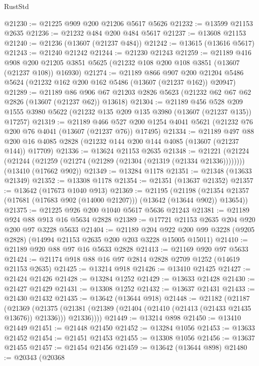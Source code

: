 \begin{lexlean}{RustStd}
\begin{coremodule}
@21230 := @21225 @909 @200 @21206 @5617 @5626
@21232 := @13599 @21153 @2635
@21236 := @21232 @484 @200 @484 @5617
@21237 := @13608 @21153
@21240 := @21236 (@13607 (@21237 @484))
@21242 := @13615 (@13616 @5617)
@21243 := @21240 @21242
@21244 := @21230 @21243
@21259 := @21189
    @416
    @908
    @200
    @21205
    @3851
    @5625
    (@21232 @108 @200 @108 @3851 (@13607 (@21237 @108)) @16930)
@21274 := @21189
    @866
    @907
    @200
    @21204
    @5486
    @5624
    (@21232 @162 @200 @162 @5486 (@13607 (@21237 @162)) @20947)
@21289 := @21189
    @86
    @906
    @67
    @21203
    @2826
    @5623
    (@21232 @62 @67 @62 @2826 (@13607 (@21237 @62)) @13618)
@21304 := @21189
    @456
    @528
    @209
    @1555
    @3980
    @5622
    (@21232 @135 @209 @135 @3980 (@13607 (@21237 @135)) @17257)
@21319 := @21189
    @466
    @527
    @200
    @1254
    @4041
    @5621
    (@21232 @76 @200 @76 @4041 (@13607 (@21237 @76)) @17495)
@21334 := @21189
    @497
    @88
    @200
    @16
    @4085
    @2828
    (@21232 @144 @200 @144 @4085 (@13607 (@21237 @144)) @17709)
@21336 := @13624 @21153 @2635
@21348 := @21221
    (@21224 (@21244 (@21259 (@21274 (@21289 (@21304 (@21319 (@21334 @21336))))))))
    (@13410 (@17662 @902))
@21349 := @13284 @1178
@21351 := @21348 (@13633 @21349)
@21352 := @13308 @1178
@21354 := @21351 (@13637 @21352)
@21357 := @13642 (@17673 @1040 @913)
@21369 := @21195
    (@21198 (@21354 @21357 (@17681 (@17683 @902 (@14000 @21207))) (@13642 (@13644 @902)) @13654))
@21375 := @21225 @926 @200 @1040 @5617 @5636 @21243
@21381 := @21189 @924 @88 @913 @16 @5634 @2828
@21389 := @17721 @21153 @2635 @204 @920 @200 @97 @3228 @5633
@21404 := @21189
    @204
    @922
    @200
    @99
    @3228
    (@9205 @2828)
    (@14994 @21153 @2635 @200 @203 @3228 @15005 @15011)
@21410 := @21189 @920 @88 @97 @16 @5633 @2828
@21413 := @21169 @920 @97 @5633
@21424 := @21174 @918 @88 @16 @97 @2814 @2828 @2709 @1252 (@14619 @21153 @2635)
@21425 := @13214 @918
@21426 := @13410 @21425
@21427 := @21424 @21426
@21428 := @13284 @1252
@21429 := @13633 @21428
@21430 := @21427 @21429
@21431 := @13308 @1252
@21432 := @13637 @21431
@21433 := @21430 @21432
@21435 := @13642 (@13644 @918)
@21448 := @21182
    (@21187
      (@21369
        (@21375 (@21381 (@21389 (@21404 (@21410 (@21413 (@21433 @21435 @13676)) @21336))) @21336))))
@21449 := @13214 @898
@21450 := @13410 @21449
@21451 := @21448 @21450
@21452 := @13284 @1056
@21453 := @13633 @21452
@21454 := @21451 @21453
@21455 := @13308 @1056
@21456 := @13637 @21455
@21457 := @21454 @21456
@21459 := @13642 (@13644 @898)
@21480 := @20343
    (@20368

\end{coremodule}
\end{lexlean}
